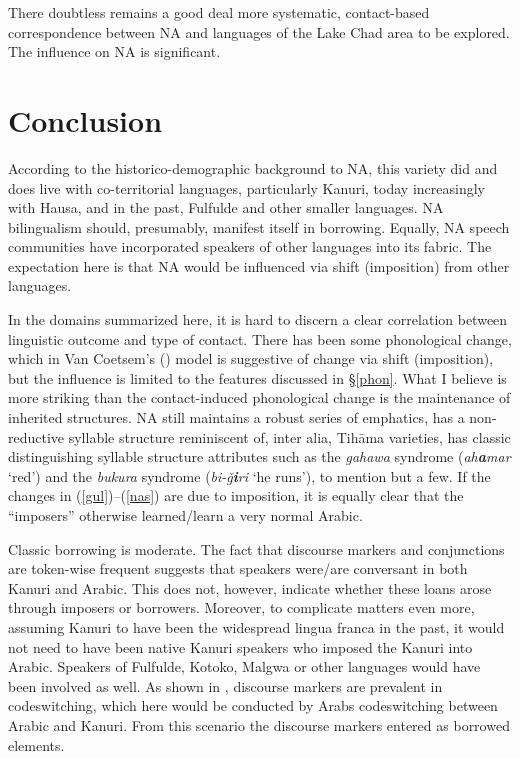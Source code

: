 \documentclass[output=paper]{langsci/langscibook}
\begin{document}
There doubtless remains a good deal more systematic, contact-based correspondence between NA and languages of the Lake Chad area to be explored. The influence on NA is significant.

\section{Conclusion
} \label{conc}

According to the historico-demographic background to NA, this variety did and does live with co-territorial languages, particularly Kanuri, today increasingly with Hausa, and in the past, Fulfulde and other smaller languages. NA bilingualism should, presumably, manifest itself in borrowing. Equally, NA speech communities have incorporated speakers of other languages into its fabric. The expectation here is that NA would be influenced via shift (imposition) from other languages.

In the domains summarized here, it is hard to discern a clear correlation between linguistic outcome and type of contact. There has been some phonological change, which in Van Coetsem’s (\citeyear{VanCoetsem1988,VanCoetsem2000}) model is suggestive of change via shift (imposition), but the influence is limited to the features discussed in §\ref{phon}. What I believe is more striking than the contact-induced phonological change is the maintenance of inherited structures. NA still maintains a robust series of emphatics, has a non-reductive syllable structure reminiscent of, inter alia, Tihāma varieties, has classic distinguishing syllable structure attributes such as the \textit{gahawa} syndrome (\textit{ah}\textbf{\textit{a}}\textit{mar} ‘red’) and the \textit{bukura} syndrome (\textit{bi-ǧ}\textbf{\textit{i}}\textit{ri} ‘he runs’), to mention but a few. If the changes in (\ref{gul})–(\ref{nas}) are due to imposition, it is equally clear that the “imposers” otherwise learned/learn a very normal Arabic. 

Classic borrowing is moderate. The fact that discourse markers and conjunctions are token-wise frequent suggests that speakers were/are conversant in both Kanuri and Arabic. This does not, however, indicate whether these loans arose through imposers or borrowers. Moreover, to complicate matters even more, assuming Kanuri to have been the widespread lingua franca in the past, it would not need to have been native Kanuri speakers who imposed the Kanuri into Arabic. Speakers of Fulfulde, Kotoko, Malgwa or other languages would have been involved as well. As shown in \citet{OwensHassan2010}, discourse markers are prevalent in codeswitching, which here would be conducted by Arabs codeswitching between Arabic and Kanuri. From this scenario the discourse markers entered as borrowed elements.
\end{document}
